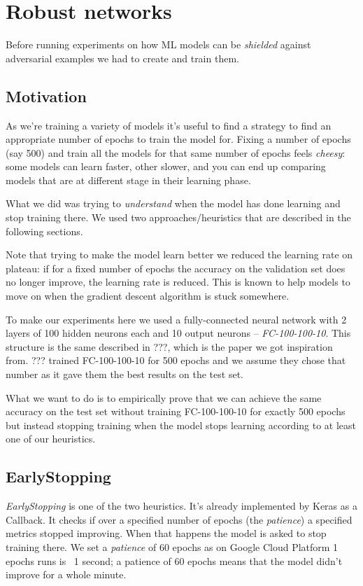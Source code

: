 \chapter{Robust networks}

Before running experiments on how ML models can be \emph{shielded}
against adversarial examples we had to create and train them.

\section{Motivation}
\label{sec:motivation}
As we're training a variety of models it's useful to find a strategy to
find an appropriate number of epochs to train the model for. Fixing a
number of epochs (say 500) and train all the models for that same
number of epochs feels \emph{cheesy}: some models can learn faster,
other slower, and you can end up comparing models that are at different
stage in their learning phase.

What we did was trying to \emph{understand} when the model has done
learning and stop training there. We used two approaches/heuristics
that are described in the following sections.

Note that trying to make the model learn better we reduced the learning
rate on plateau: if for a fixed number of epochs the accuracy on the
validation set does no longer improve, the learning rate is reduced.
This is known to help models to move on when the gradient descent
algorithm is stuck somewhere.

To make our experiments here we used a fully-connected neural network
with 2 layers of 100 hidden neurons each and 10 output neurons --
\emph{FC-100-100-10}. This structure is the same described in ???,
which is the paper we got inspiration from. ??? trained FC-100-100-10
for 500 epochs and we assume they chose that number as it gave them the
best results on the test set.

What we want to do is to empirically prove that we can achieve the
same accuracy on the test set without training FC-100-100-10 for
exactly 500 epochs but instead stopping training when the model stops
learning according to at least one of our heuristics.

\section{EarlyStopping}
\emph{EarlyStopping} is one of the two heuristics. It's already
implemented by Keras as a Callback. It checks if over a specified
number of epochs (the \emph{patience}) a specified metrics stopped
improving. When that happens the model is asked to stop training there.
We set a \emph{patience} of 60 epochs as on Google Cloud Platform 1
epochs runs is ~1 second; a patience of 60 epochs means that the model
didn't improve for a whole minute.

